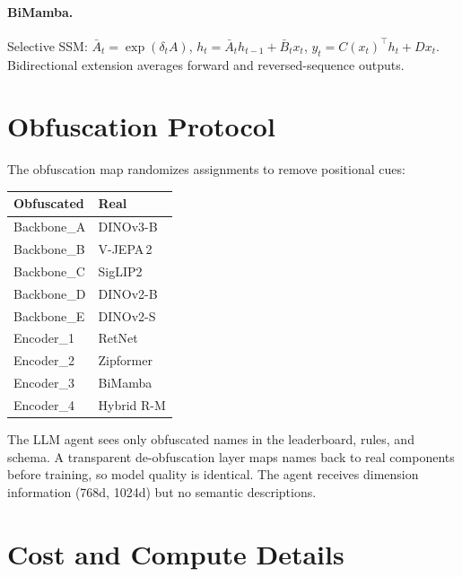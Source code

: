 \documentclass{article}
\begin{document}
\paragraph{BiMamba.}
Selective SSM: $\bar{A}_t = \exp(\delta_t A)$, $h_t = \bar{A}_t h_{t-1} + \bar{B}_t x_t$, $y_t = C(x_t)^{\!\top} h_t + D x_t$. Bidirectional extension averages forward and reversed-sequence outputs.


\section{Obfuscation Protocol}
\label{app:obfuscation}

The obfuscation map randomizes assignments to remove positional cues:

\begin{center}
\small
\begin{tabular}{@{}ll@{}}
\toprule
Obfuscated & Real \\
\midrule
Backbone\_A & DINOv3-B \\
Backbone\_B & V-JEPA\,2 \\
Backbone\_C & SigLIP2 \\
Backbone\_D & DINOv2-B \\
Backbone\_E & DINOv2-S \\
\midrule
Encoder\_1 & RetNet \\
Encoder\_2 & Zipformer \\
Encoder\_3 & BiMamba \\
Encoder\_4 & Hybrid R-M \\
\bottomrule
\end{tabular}
\end{center}

The LLM agent sees only obfuscated names in the leaderboard, rules, and schema. A transparent de-obfuscation layer maps names back to real components before training, so model quality is identical. The agent receives dimension information (768d, 1024d) but no semantic descriptions.


\section{Cost and Compute Details}
\label{app:cost}
\end{document}
